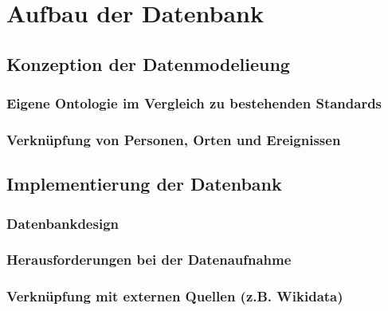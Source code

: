 \documentclass[12pt, a4paper, ngerman, bidi=default]{article}
\begin{document}
\newpage

\section{Aufbau der Datenbank}
    \subsection{Konzeption der Datenmodelieung}
      \subsubsection{Eigene Ontologie im Vergleich zu bestehenden Standards}
      \subsubsection{Verknüpfung von Personen, Orten und Ereignissen}
    
    \subsection{Implementierung der Datenbank}
      \subsubsection{Datenbankdesign}
      \subsubsection{Herausforderungen bei der Datenaufnahme}
      \subsubsection{Verknüpfung mit externen Quellen (z.B. Wikidata)}

    \newpage
\end{document}
